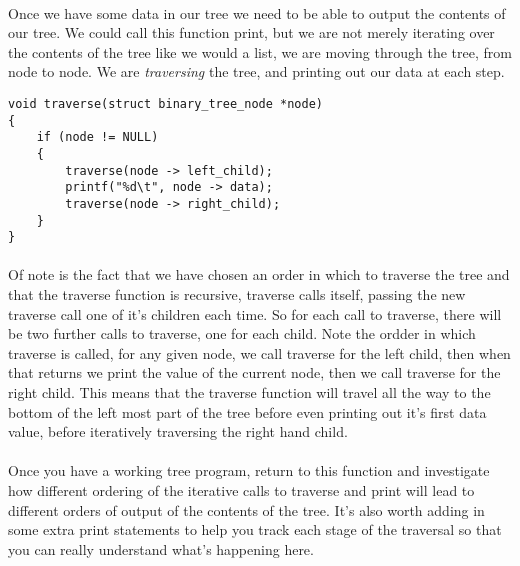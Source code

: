 \documentclass[10pt, a4paper, twosize]{article}
\begin{document}
\paragraph{} Once we have some data in our tree we need to be able to output the contents of our tree. We could call this function print, but we are not merely iterating over the contents of the tree like we would a list, we are moving through the tree, from node to node. We are \emph{traversing} the tree, and printing out our data at each step.
\begin{lstlisting}
void traverse(struct binary_tree_node *node)
{
    if (node != NULL)
    {
        traverse(node -> left_child);
        printf("%d\t", node -> data);
        traverse(node -> right_child);
    }
}
\end{lstlisting}
\paragraph{} Of note is the fact that we have chosen an order in which to traverse the tree and that the traverse function is recursive, traverse calls itself, passing the new traverse call one of it's children each time. So for each call to traverse, there will be two further calls to traverse, one for each child. Note the ordder in which traverse is called, for any given node, we call traverse for the left child, then when that returns we print the value of the current node, then we call traverse for the right child. This means that the traverse function will travel all the way to the bottom of the left most part of the tree before even printing out it's first data value, before iteratively traversing the right hand child. 

\paragraph{} Once you have a working tree program, return to this function and investigate how different ordering of the iterative calls to traverse and print will lead to different orders of output of the contents of the tree. It's also worth adding in some extra print statements to help you track each stage of the traversal so that you can really understand what's happening here.
\end{document}
